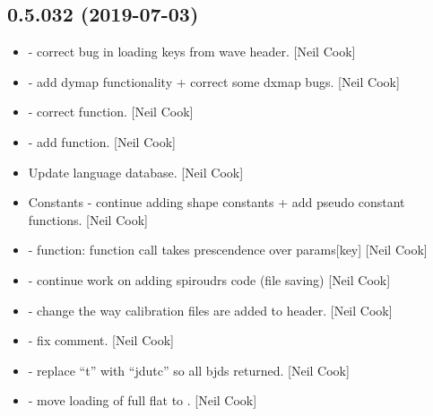 \documentclass[a4paper,10pt,english]{report}
\begin{document}
\subsection{0.5.032 (2019-07-03)}
\label{\detokenize{misc/changelog:id107}}\begin{itemize}
\item {} 
 - correct bug in loading keys from wave header.
{[}Neil Cook{]}

\item {} 
 - add dymap functionality + correct some dxmap
bugs. {[}Neil Cook{]}

\item {} 
 - correct  function.
{[}Neil Cook{]}

\item {} 
 - add  function. {[}Neil
Cook{]}

\item {} 
Update language database. {[}Neil Cook{]}

\item {} 
Constants - continue adding shape constants + add pseudo constant
functions. {[}Neil Cook{]}

\item {} 
 -  function: function call takes prescendence
over params{[}key{]} {[}Neil Cook{]}

\item {} 
 - continue work on adding spiroudrs code
(file saving) {[}Neil Cook{]}

\item {} 
 - change the way calibration files are added to
header. {[}Neil Cook{]}

\item {} 
 - fix comment. {[}Neil Cook{]}

\item {} 
 - replace “t” with “jdutc” so all bjds returned. {[}Neil
Cook{]}

\item {} 
 - move loading of full flat to
. {[}Neil Cook{]}


\end{itemize}
\end{document}
